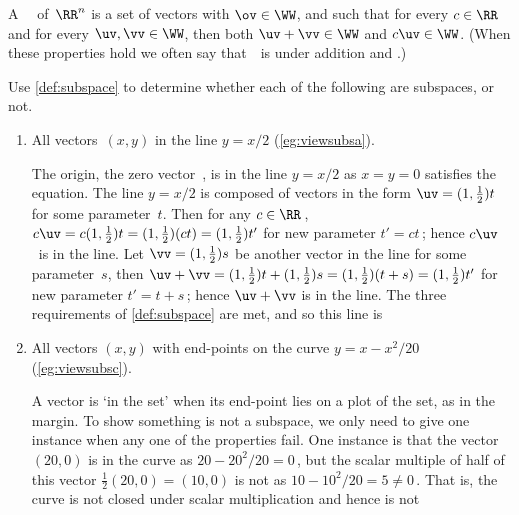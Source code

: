 \begin{definition} \label{def:subspace} 
A ~\WW\ of~\(\RR^n\) is a set of vectors with \(\ov\in\WW\), and such that for every \(c\in\RR\) and for every \(\uv,\vv\in\WW\), then both \(\uv+\vv\in\WW\) and \(c\uv\in\WW\). 
(When these properties hold we often say that~\WW\ is  under addition and .) 
\end{definition}


\begin{example} \label{eg:somsubs}
Use \cref{def:subspace} to determine whether each of the following are subspaces, or not. 
\begin{enumerate}[ref=\ref{eg:somsubs}(\alph*)]
\item All vectors~\((x,y)\) in the line \(y=x/2\) (\cref{eg:viewsubsa}).
\begin{solution} 
The origin, the zero vector~\ov, is in the line \(y=x/2\) as \(x=y=0\) satisfies the equation.
%
The line \(y=x/2\) is composed of vectors in the form \(\uv=(1,\frac12)t\) for some parameter~\(t\).
Then for any \(c\in\RR\)\,, \(c\uv=c(1,\frac12)t=(1,\frac12)(ct)=(1,\frac12)t'\) for new parameter \(t'=ct\)\,; hence \(c\uv\)~is in the line.
Let \(\vv=(1,\frac12)s\) be another vector in the line for some parameter~\(s\), then \(\uv+\vv=(1,\frac12)t+(1,\frac12)s=(1,\frac12)(t+s)=(1,\frac12)t'\) for new parameter \(t'=t+s\)\,; hence \(\uv+\vv\) is in the line.
The three requirements of \cref{def:subspace} are met, and so this line is 
\end{solution}

\item All vectors \((x,y)\) with end-points on the curve \(y=x-x^2/20\) (\cref{eg:viewsubsc}).
\begin{solution} 
A vector is `in the set' when its end-point lies on a plot of the set, as in the margin.
%
To show something is not a subspace, we only need to give one instance when any one of the properties fail.
One instance is that the vector \((20,0)\) is in the curve as \(20-20^2/20=0\)\,, but the scalar multiple of half of this vector \(\frac12(20,0)=(10,0)\) is not as \(10-10^2/20=5\neq0\)\,.
That is, the curve is not closed under scalar multiplication and hence is not 
\end{solution}


\end{enumerate}
\end{example}
